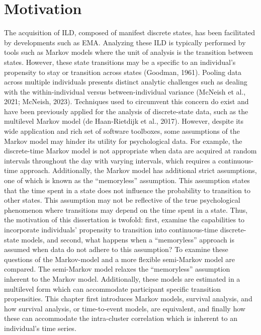 \documentclass[12pt]{./styles/outhesis}
\begin{document}
\section{Motivation}
The acquisition of ILD, composed of manifest discrete states, has been
facilitated by developments such as EMA. Analyzing these ILD is
typically performed by tools such as Markov models where the unit of
analysis is the transition between states. However, these state
transitions may be a specific to an individual's propensity to stay or
transition across states (Goodman, 1961). Pooling data across multiple
individuals presents distinct analytic challenges such as dealing with
the within-individual versus between-individual variance (McNeish et
al., 2021; McNeish, 2023). Techniques used to circumvent this concern do
exist and have been previously applied for the analysis of
discrete-state data, such as the multilevel Markov model (de
Haan-Rietdijk et al., 2017). However, despite its wide application and
rich set of software toolboxes, some assumptions of the Markov model may
hinder its utility for psychological data. For example, the
discrete-time Markov model is not appropriate when data are acquired at
random intervals throughout the day with varying intervals, which
requires a continuous-time approach. Additionally, the Markov model has
additional strict assumptions, one of which is known as the
``memoryless'' assumption. This assumption states that the time spent in
a state does not influence the probability to transition to other
states. This assumption may not be reflective of the true psychological
phenomenon where transitions may depend on the time spent in a state.
Thus, the motivation of this dissertation is twofold: first, examine the
capabilities to incorporate individuals' propensity to transition into
continuous-time discrete-state models, and second, what happens when a
``memoryless'' approach is assumed when data do not adhere to this
assumption? To examine these questions of the Markov-model
and a more flexible semi-Markov model are compared. The semi-Markov
model relaxes the ``memoryless'' assumption inherent to the Markov
model. Additionally, these models are estimated in a multilevel form
which can accommodate participant specific transition propensities. This
chapter first introduces Markov models, survival analysis, and how
survival analysis, or time-to-event models, are equivalent, and finally
how these can accommodate the intra-cluster correlation which is
inherent to an individual's time series.
\end{document}
